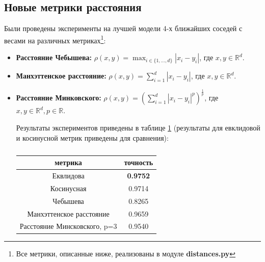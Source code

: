 \documentclass[a4paper, 11pt]{article}
\begin{document}
        \subsection{Новые метрики расстояния}
                Были проведены эксперименты на лучшей модели 4-х ближайших соседей с весами на различных метриках\footnote{Все метрики, описанные ниже, реализованы в модуле \textbf{distances.py}}:
                \begin{itemize}
                    \item \textbf{Расстояние Чебышева:} $\rho(x, y) = \max_{i \in \{1, \dots, d\}}|x_{i} - y_{i}|$, где $x, y \in \mathbb{R}^d$.
                    \item \textbf{Манхэттенское расстояние:} $\rho(x, y) = \sum_{i = 1}^{d}|x_{i} - y_{i}|$, где $x, y \in \mathbb{R}^d$.
                    \item \textbf{Расстояние Минковского:} $\rho(x, y) = \left(\sum_{i = 1}^{d}|x_{i} - y_{i}|^p \right)^\frac{1}{p}$, где $x, y \in \mathbb{R}^d, p \in \mathbb{R}$.
                    
                Результаты экспериментов приведены в таблице \ref{extraexp:table} (результаты для евклидовой и косинусной метрик приведены для сравнения):
                \begin{table}[h]
                    \begin{center}
                        \caption{} \label{extraexp:table}
                        \begin{tabular}{|c|c|}
                            \hline 
                            метрика & точность \\ 
                            \hline 
                            Еквлидова & \textbf{0.9752} \\ 
                            \hline 
                            Косинусная & 0.9714 \\ 
                            \hline 
                            Чебышева & 0.8265 \\ 
                            \hline 
                            Манхэттенское расстояние & 0.9659 \\ 
                            \hline 
                            Расстояние Минсковского, p=3 & 0.9540 \\ 
                            \hline 
                        \end{tabular} 
                    \end{center}
                \end{table}
                
                \end{itemize}
\end{document}

